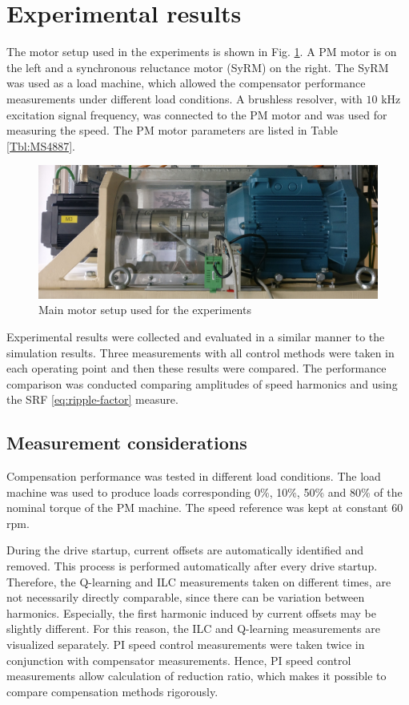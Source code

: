 \section{Experimental results}
The motor setup used in the experiments is shown in Fig. \ref{Fig:M3-setup}. A PM motor is on the left and a synchronous reluctance motor (SyRM) on the right. The SyRM was used as a load machine, which allowed the compensator performance measurements under different load conditions. A brushless resolver, with $10$ kHz excitation signal frequency, was connected to the PM motor and was used for measuring the speed. The PM motor parameters are listed in Table \ref{Tbl:MS4887}.

\begin{figure}[htb] 
    \centering
    \includegraphics[width=1.0\textwidth]{images/M3-setup.jpg}
    \caption{Main motor setup used for the experiments}
    \label{Fig:M3-setup} 
\end{figure}

Experimental results were collected and evaluated in a similar manner to the simulation results. Three measurements with all control methods were taken in each operating point and then these results were compared. The performance comparison was conducted comparing amplitudes of speed harmonics and using the SRF \eqref{eq:ripple-factor} measure.


\subsection{Measurement considerations}
Compensation performance was tested in different load conditions. The load machine was used to produce loads corresponding 0\%, 10\%, 50\% and 80\% of the nominal torque of the PM machine. The speed reference was kept at constant $60$ rpm.

During the drive startup, current offsets are automatically identified and removed. This process is performed automatically after every drive startup. Therefore, the Q-learning and ILC measurements taken on different times, are not necessarily directly comparable, since there can be variation between harmonics. Especially, the first harmonic induced by current offsets may be slightly different. For this reason, the ILC and Q-learning measurements are visualized separately. PI speed control measurements were taken twice in conjunction with compensator measurements. Hence, PI speed control measurements allow calculation of reduction ratio, which makes it possible to compare compensation methods rigorously.

